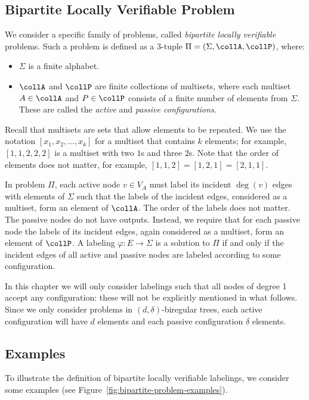 \subsection{Bipartite Locally Verifiable Problem}

We consider a specific family of problems, called \emph{bipartite locally verifiable} problems. Such a problem is defined as a 3-tuple $\Pi = (\Sigma, \collA, \collP)$, where:
\begin{itemize}
	\item $\Sigma$ is a finite alphabet.
	\item $\collA$ and $\collP$ are finite collections of multisets, where each multiset $A \in \collA$ and $P \in \collP$ consists of a finite number of elements from $\Sigma$. These are called the \emph{active} and \emph{passive configurations}. 
\end{itemize}
Recall that multisets are sets that allow elements to be repeated. We use the notation $[x_1, x_2, \dotsc, x_k]$ for a multiset that contains $k$ elements; for example, $[1,1,2,2,2]$ is a multiset with two $1$s and three $2$s. Note that the order of elements does not matter, for example, $[1,1,2] = [1,2,1] = [2,1,1]$.

In problem $\Pi$, each active node $v \in V_A$ must label its incident $\deg(v)$ edges with elements of $\Sigma$ such that the labels of the incident edges, considered as a multiset, form an element of $\collA$. The order of the labels does not matter. The passive nodes do not have outputs. Instead, we require that for each passive node the labels of its incident edges, again considered as a multiset, form an element of $\collP$. A labeling $\varphi\colon E \to \Sigma$ is a solution to $\Pi$ if and only if the incident edges of all active and passive nodes are labeled according to some configuration.

In this chapter we will only consider labelings such that all nodes of degree 1 accept any configuration: these will not be explicitly mentioned in what follows. Since we only consider problems in $(d,\delta)$-biregular trees, each active configuration will have $d$ elements and each passive configuration $\delta$ elements.

\subsection{Examples} \label{ssec:bipartite-examples}

To illustrate the definition of bipartite locally verifiable labelings, we consider some examples (see Figure~\ref{fig:bipartite-problem-examples}).

